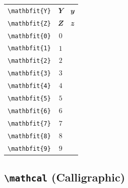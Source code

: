 \documentclass[12pt,a4paper]{article}
\begin{document}
\begin{longtable}{|c|c|c|}
\verb|\mathbfit{Y}| & $\mathbfit{Y}$ & $\mathbfit{y}$ \\ %
\verb|\mathbfit{Z}| & $\mathbfit{Z}$ & $\mathbfit{z}$ \\ %
\verb|\mathbfit{0}| & $\mathbfit{0}$ & \\ %
\verb|\mathbfit{1}| & $\mathbfit{1}$ & \\ %
\verb|\mathbfit{2}| & $\mathbfit{2}$ & \\ %
\verb|\mathbfit{3}| & $\mathbfit{3}$ & \\ %
\verb|\mathbfit{4}| & $\mathbfit{4}$ & \\ %
\verb|\mathbfit{5}| & $\mathbfit{5}$ & \\ %
\verb|\mathbfit{6}| & $\mathbfit{6}$ & \\ %
\verb|\mathbfit{7}| & $\mathbfit{7}$ & \\ %
\verb|\mathbfit{8}| & $\mathbfit{8}$ & \\ %
\verb|\mathbfit{9}| & $\mathbfit{9}$ & \\ %
\hline
\end{longtable}

\newpage

\subsection*{\texttt{\textbackslash{}mathcal} (Calligraphic)}
\end{document}
